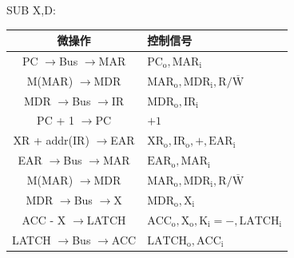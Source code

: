 \documentclass[UTF8]{report}
\newenvironment{solution}{{\noindent\hskip 2em \bf 解 \quad}}{}
\renewcommand{\to}{$\rightarrow$}
\begin{document}
\begin{solution}
        SUB X,D:
        \begin{table}[htbp]
            \centering
            \begin{tabular}{cl}
                \toprule
                微操作 & 控制信号 \\
                \midrule
                PC \to Bus \to MAR        & $\mathrm{PC_o, MAR_i                   }$ \\
                M(MAR) \to MDR            & $\mathrm{MAR_o, MDR_i, R/\overline{W}  }$ \\
                MDR \to Bus \to IR        & $\mathrm{MDR_o, IR_i                   }$ \\
                PC + 1 \to PC             & $\mathrm{+1                            }$ \\
                \midrule
                XR + addr(IR) \to EAR     & $\mathrm{XR_o, IR_o, +, EAR_i          }$ \\
                EAR \to Bus \to MAR       & $\mathrm{EAR_o, MAR_i                  }$ \\
                M(MAR) \to MDR            & $\mathrm{MAR_o, MDR_i, R/\overline{W}  }$ \\
                MDR \to Bus \to X         & $\mathrm{MDR_o, X_i                    }$ \\
                ACC - X \to LATCH         & $\mathrm{ACC_o, X_o, K_i=-, LATCH_i    }$ \\
                LATCH \to Bus \to ACC     & $\mathrm{LATCH_o, ACC_i                }$ \\
                \bottomrule
            \end{tabular}
        \end{table}
\end{solution}
\end{document}
